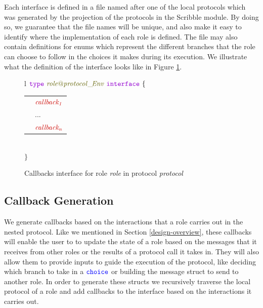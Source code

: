 \documentclass[12pt,twoside]{report}
\begin{document}
Each interface is defined in a file named after one of the local protocols which was generated by the projection of the protocols in the Scribble module. By doing so, we guarantee that the file names will be unique, and also make it easy to identify where the implementation of each role is defined. The file may also contain definitions for enums which represent the different branches that the role can choose to follow in the choices it makes during its execution. We illustrate what the definition of the interface looks like in Figure \ref{callbacks-interface-gen}.\\

\begin{figure}[!h]
    \begin{center}
        \begin{tabular}{l}
            $\gotype\ \interfacename{\localprotocol{role}{protocol}\_\!Env}\ \gointerface\ \{$ \\[3pt]
            \begin{tabular}{ll}
                \indent & $\functionname{callback_1}$\\[3.5pt]
                \indent & ...\\[3.5pt]
                \indent & $\functionname{callback_n}$\\[3.5pt]
            \end{tabular}\\[3pt]
            $\}$
        \end{tabular}

    \end{center}
    \caption{Callbacks interface for role \textit{role} in protocol \textit{protocol}}
    \label{callbacks-interface-gen}
\end{figure}

\subsection{Callback Generation}

We generate callbacks based on the interactions that a role carries out in the nested protocol. Like we mentioned in Section \ref{design-overview}, these callbacks will enable the user to  to update the state of a role based on the messages that it receives from other roles or the results of a protocol call it takes in. They will also allow them to provide inputs to guide the execution of the protocol, like deciding which branch to take in a ${\color{blue}\mathtt{choice}}$ or building the message struct to send to another role. In order to generate these structs we recursively traverse the local protocol of a role and add callbacks to the interface based on the interactions it carries out.\\
\end{document}
